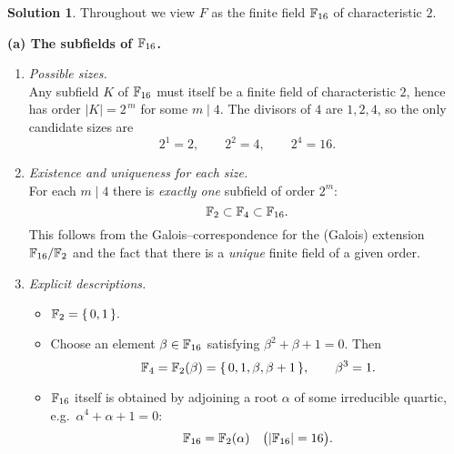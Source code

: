 \documentclass[12pt]{article}
\theoremstyle{definition} %
\newtheorem{solution}{Solution}
\theoremstyle{plain} %
\begin{document}
            \begin{solution}
            Throughout we view $F$ as the finite field $\Bbb F_{16}$ of
            characteristic $2$.
            
            \bigskip
            \noindent\textbf{(a)  The subfields of $\Bbb F_{16}$.}
            
            \begin{enumerate}[]
               \item \emph{Possible sizes.}\\
                     Any subfield $K$ of $\Bbb F_{16}$ must itself be a finite
                     field of characteristic $2$, hence has order
                     $|K| = 2^{\,m}$ for some $m\mid4$.
                     The divisors of $4$ are $1,2,4$, so the only candidate sizes
                     are
                     \[
                        2^{1}=2,\qquad
                        2^{2}=4,\qquad
                        2^{4}=16.
                     \]
               \item \emph{Existence and uniqueness for each size.}\\
                     For each $m\mid4$ there is \emph{exactly one}
                     subfield of order $2^{m}$:
                     \[
                        \Bbb F_{2}\subset\Bbb F_{4}\subset\Bbb F_{16}.
                     \]
                     This follows from the Galois–correspondence
                     for the (Galois) extension $\Bbb F_{16}/\Bbb F_{2}$ and the fact
                     that there is a \emph{unique} finite field of a given order.
               \item \emph{Explicit descriptions.}\\[-3pt]
                     \begin{itemize}
                        \item $\displaystyle\Bbb F_{2}
                               =\{\,0,1\,\}.$
                        \item Choose an element
                              $\beta\in\Bbb F_{16}$ satisfying
                              $\beta^{2}+\beta+1=0$.
                              Then
                              \[
                                 \Bbb F_{4}=\Bbb F_{2}(\beta)
                                   =\{\,0,1,\beta,\beta+1\,\},
                                   \qquad
                                 \beta^{3}=1.
                              \]
                        \item $\displaystyle\Bbb F_{16}$ itself is obtained by adjoining
                              a root $\alpha$ of some irreducible quartic,
                              e.g.\ $\alpha^{4}+\alpha+1=0$:
                              \[
                                 \Bbb F_{16}=\Bbb F_{2}(\alpha)
                                 \quad\bigl(|\Bbb F_{16}|=16\bigr).
                              \]
                     \end{itemize}
            \end{enumerate}
            

\end{solution}
\end{document}
